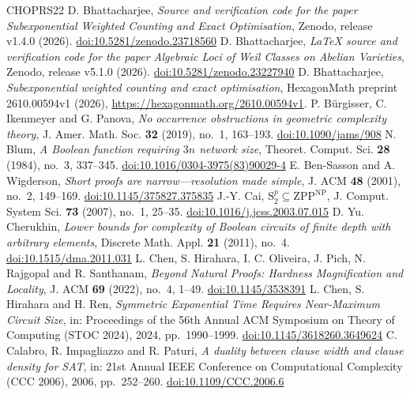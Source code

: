 \begin{thebibliography}{CHOPRS22}
 D. Bhattacharjee, \emph{Source and verification code for the paper Subexponential Weighted Counting and Exact Optimisation}, Zenodo, release v1.4.0 (2026). \href{https://doi.org/10.5281/zenodo.23718560}{doi:10.5281/zenodo.23718560}
 D. Bhattacharjee, \emph{LaTeX source and verification code for the paper Algebraic Loci of Weil Classes on Abelian Varieties}, Zenodo, release v5.1.0 (2026). \href{https://doi.org/10.5281/zenodo.23227940}{doi:10.5281/zenodo.23227940}
 D. Bhattacharjee, \emph{Subexponential weighted counting and exact optimisation}, HexagonMath preprint 2610.00594v1 (2026), \url{https://hexagonmath.org/2610.00594v1}.
 P. B{\"u}rgisser, C. Ikenmeyer and G. Panova, \emph{No occurrence obstructions in geometric complexity theory}, J. Amer. Math. Soc. \textbf{32} (2019), no.~1, 163--193. \href{https://doi.org/10.1090/jams/908}{doi:10.1090/jams/908}
 N. Blum, \emph{A Boolean function requiring $3n$ network size}, Theoret. Comput. Sci. \textbf{28} (1984), no.~3, 337--345. \href{https://doi.org/10.1016/0304-3975(83)90029-4}{doi:10.1016/0304-3975(83)90029-4}
 E. Ben-Sasson and A. Wigderson, \emph{Short proofs are narrow---resolution made simple}, J. ACM \textbf{48} (2001), no.~2, 149--169. \href{https://doi.org/10.1145/375827.375835}{doi:10.1145/375827.375835}
 J.-Y. Cai, \emph{$\mathrm{S}_2^p\subseteq\mathrm{ZPP}^{\mathrm{NP}}$}, J. Comput. System Sci. \textbf{73} (2007), no.~1, 25--35. \href{https://doi.org/10.1016/j.jcss.2003.07.015}{doi:10.1016/j.jcss.2003.07.015}
 D. Yu. Cherukhin, \emph{Lower bounds for complexity of Boolean circuits of finite depth with arbitrary elements}, Discrete Math. Appl. \textbf{21} (2011), no.~4. \href{https://doi.org/10.1515/dma.2011.031}{doi:10.1515/dma.2011.031}
 L. Chen, S. Hirahara, I. C. Oliveira, J. Pich, N. Rajgopal and R. Santhanam, \emph{Beyond Natural Proofs: Hardness Magnification and Locality}, J. ACM \textbf{69} (2022), no.~4, 1--49. \href{https://doi.org/10.1145/3538391}{doi:10.1145/3538391}
 L. Chen, S. Hirahara and H. Ren, \emph{Symmetric Exponential Time Requires Near-Maximum Circuit Size}, in: Proceedings of the 56th Annual ACM Symposium on Theory of Computing (STOC 2024), 2024, pp.~1990--1999. \href{https://doi.org/10.1145/3618260.3649624}{doi:10.1145/3618260.3649624}
 C. Calabro, R. Impagliazzo and R. Paturi, \emph{A duality between clause width and clause density for SAT}, in: 21st Annual IEEE Conference on Computational Complexity (CCC 2006), 2006, pp.~252--260. \href{https://doi.org/10.1109/CCC.2006.6}{doi:10.1109/CCC.2006.6}

\end{thebibliography}
